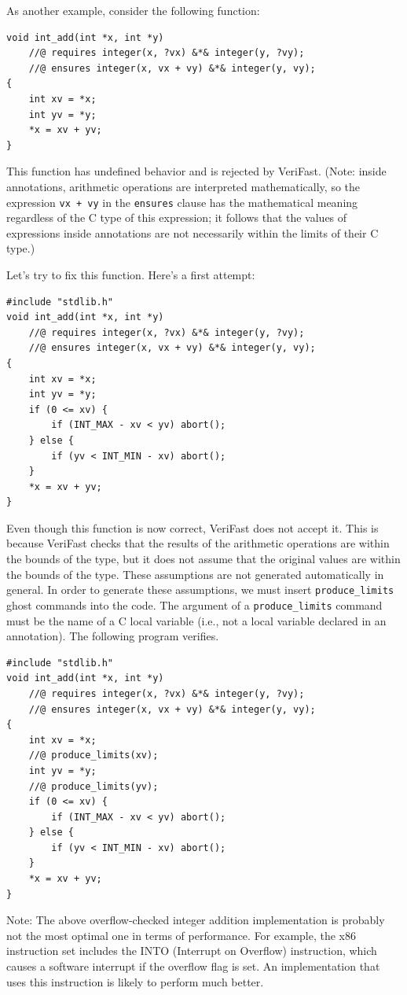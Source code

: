\documentclass{article}
\begin{document}
As another example, consider the following function:
\begin{lstlisting}
void int_add(int *x, int *y)
    //@ requires integer(x, ?vx) &*& integer(y, ?vy);
    //@ ensures integer(x, vx + vy) &*& integer(y, vy);
{
    int xv = *x;
    int yv = *y;
    *x = xv + yv;
}
\end{lstlisting}
This function has undefined behavior and is rejected by VeriFast. (Note: inside annotations, arithmetic operations are interpreted mathematically, so the expression \verb|vx + vy| in the \verb|ensures| clause has the mathematical meaning regardless of the C type of this expression; it follows that the values of expressions inside annotations are not necessarily within the limits of their C type.)

Let's try to fix this function. Here's a first attempt:
\begin{lstlisting}
#include "stdlib.h"
void int_add(int *x, int *y)
    //@ requires integer(x, ?vx) &*& integer(y, ?vy);
    //@ ensures integer(x, vx + vy) &*& integer(y, vy);
{
    int xv = *x;
    int yv = *y;
    if (0 <= xv) {
        if (INT_MAX - xv < yv) abort();
    } else {
        if (yv < INT_MIN - xv) abort();
    }
    *x = xv + yv;
}
\end{lstlisting}
Even though this function is now correct,
VeriFast does not accept it. This is because VeriFast checks
that the results of the arithmetic operations are within the
bounds of the type, but it does not assume that the original
values are within the bounds of the type. These assumptions are
not generated automatically in general. In order to generate these assumptions, we must insert
\lstinline!produce_limits! ghost commands into the code. The
argument of a \lstinline!produce_limits! command must be the
name of a C local variable (i.e., not a local variable declared
in an annotation). The following program verifies.
\begin{lstlisting}
#include "stdlib.h"
void int_add(int *x, int *y)
    //@ requires integer(x, ?vx) &*& integer(y, ?vy);
    //@ ensures integer(x, vx + vy) &*& integer(y, vy);
{
    int xv = *x;
    //@ produce_limits(xv);
    int yv = *y;
    //@ produce_limits(yv);
    if (0 <= xv) {
        if (INT_MAX - xv < yv) abort();
    } else {
        if (yv < INT_MIN - xv) abort();
    }
    *x = xv + yv;
}
\end{lstlisting}

Note: The above overflow-checked integer addition
implementation is probably not the most optimal one in terms of
performance. For example, the x86 instruction set includes the
INTO (Interrupt on Overflow) instruction, which causes a
software interrupt if the overflow flag is set. An
implementation that uses this instruction is likely to perform
much better.
\end{document}
